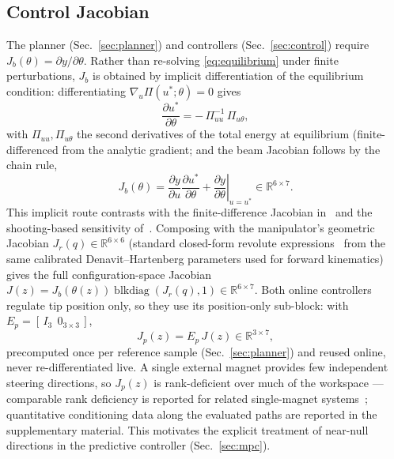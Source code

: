\documentclass[journal]{IEEEtran}
\begin{document}
\subsection{Control Jacobian}
\label{sec:jacobian}

The planner (Sec.~\ref{sec:planner}) and controllers
(Sec.~\ref{sec:control}) require $J_b(\theta)=\partial y/\partial\theta$.
Rather than re-solving \eqref{eq:equilibrium} under finite perturbations,
$J_b$ is obtained by implicit differentiation of the equilibrium
condition: differentiating $\nabla_u\Pi(u^*;\theta)=0$ gives
\begin{equation}
\frac{\partial u^{*}}{\partial\theta} = -\,\Pi_{uu}^{-1}\,\Pi_{u\theta},
\label{eq:ift}
\end{equation}
with $\Pi_{uu},\Pi_{u\theta}$ the second derivatives of the total energy
at equilibrium (finite-differenced from the analytic gradient;
and the beam Jacobian follows by the chain rule,
\begin{equation}
J_b(\theta) = \frac{\partial y}{\partial u}
\frac{\partial u^{*}}{\partial\theta}
+ \left.\frac{\partial y}{\partial\theta}\right\rvert_{u=u^{*}}
\in\mathbb{R}^{6\times7}.
\label{eq:jacobian-chain}
\end{equation}
This implicit route contrasts with the finite-difference Jacobian
in~\cite{kratchman2017guiding} and the shooting-based sensitivity
of~\cite{wu2025closedloop}. Composing with the manipulator's geometric
Jacobian $J_r(q)\in\mathbb{R}^{6\times6}$ (standard closed-form revolute
expressions~\cite{lynchpark2017modern} from the same calibrated
Denavit--Hartenberg parameters used for forward kinematics) gives the full
configuration-space Jacobian
$J(z)=J_b(\theta(z))\operatorname{blkdiag}(J_r(q),1)\in\mathbb{R}^{6\times7}$.
Both online controllers regulate tip position only, so they use its
position-only sub-block: with $E_p=[\,I_3\ \ 0_{3\times3}\,]$,
\begin{equation}
J_p(z) = E_p\,J(z)\in\mathbb{R}^{3\times7},
\label{eq:jp}
\end{equation}
precomputed once per reference sample (Sec.~\ref{sec:planner}) and reused
online, never re-differentiated live. A single external magnet provides
few independent steering directions, so $J_p(z)$ is rank-deficient over
much of the workspace --- comparable rank deficiency is reported for
related single-magnet systems~\cite{kratchman2017guiding}; quantitative
conditioning data along the evaluated paths are reported in the
supplementary material. %
This motivates the explicit treatment of near-null directions in the
predictive controller (Sec.~\ref{sec:mpc}).
\end{document}
